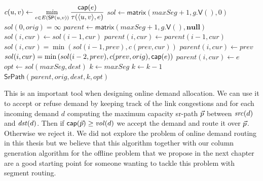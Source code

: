 \begin{algorithm}[t]
\small
\caption{$\textsf{maxCapSrPath}\left( g, \tau, orig, dest, maxSeg \right)$}
\begin{algorithmic}[1]
    \STATE $\displaystyle c(u, v) \gets \min_{e \in E(\mathsf{SP}(u, v))} \frac{\mathsf{cap}(e)}{\tau( \langle u, v \rangle, e)}$
  \ENDFOR
\ENDFOR
\STATE $sol \gets \textsf{matrix}(maxSeg + 1, g.\textsf{V}(), 0)$ \label{acap:sol1}
\STATE $sol(0, orig) = \infty$ \label{acap:sol2}
\STATE $parent \gets \textsf{matrix}(maxSeg + 1, g.\textsf{V}(), \textbf{null})$
    \STATE $sol(i, cur) \gets sol(i - 1, cur)$
    \STATE $parent(i, cur) \gets parent(i - 1, cur)$
       \label{acap:if1}
	\STATE $sol(i, cur) = \min \left( sol(i - 1, prev), c(prev, cur) \right)$
	\STATE $parent(i, cur) \gets prev$
      \ENDIF
    \ENDFOR
	   \label{acap:if2}
	    \STATE $sol(i, cur) = \min \left( sol(i - 2, prev), c(prev, orig), \mathsf{cap}(e) \right)$
	    \STATE $parent(i, cur) \gets e$
	  \ENDIF
	\ENDFOR
      \ENDFOR
    \ENDIF
  \ENDFOR
\ENDFOR
\STATE $opt \gets sol(maxSeg, dest)$
\STATE $k \gets maxSeg$
  \STATE $k \gets k - 1$
\ENDWHILE
\RETURN $\textsf{SrPath}(parent, orig, dest, k, opt)$
\end{algorithmic}
\label{algo:max_cap_sr_path}
\end{algorithm}

This is an important tool when designing online demand allocation. We can use it to accept or refuse demand by keeping track of the link congestions
and for each incoming demand $d$ computing the maximum capacity sr-path $\vec{p}$ between $\mathit{src}(d)$ and $\mathit{dst}(d)$. Then if $\mathsf{cap}(\vec{p}) \geq \mathit{vol}(d)$
we accept the demand and route it over $\vec{p}$. Otherwise we reject it. We did not explore the problem of online demand routing in this thesis but
we believe that this algorithm together with our column generation algorithm for the offline problem that we propose in the next chapter are a good
starting point for someone wanting to tackle this problem with segment routing.

